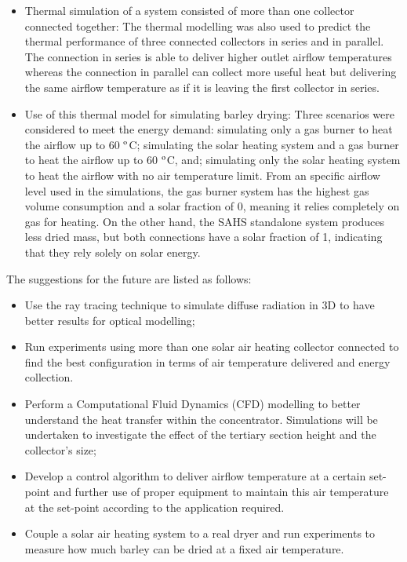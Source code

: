 \begin{itemize}
	\item Thermal simulation of a system consisted of more than one collector connected together: The thermal modelling was also used to predict the thermal performance of three connected collectors in series and in parallel. The connection in series is able to deliver higher outlet airflow temperatures whereas the connection in parallel can collect more useful heat but delivering the same airflow temperature as if it is leaving the first collector in series.
	
	
	\item Use of this thermal model for simulating barley drying: Three scenarios were considered to meet the energy demand: simulating only a gas burner to heat the airflow up to 60 $^{\rm{o}}$C; simulating the solar heating system and a gas burner to heat the airflow up to 60 $^{\rm{o}}$C, and; simulating only the solar heating system to heat the airflow with no air temperature limit. From an specific airflow level used in the simulations, the gas burner system has the highest gas volume consumption and a solar fraction of 0, meaning it relies completely on gas for heating. On the other hand, the SAHS standalone system produces less dried mass, but both connections have a solar fraction of 1, indicating that they rely solely on solar energy.
	
	
\end{itemize}

The suggestions for the future are listed as follows:

\begin{itemize}
	\item Use the ray tracing technique to simulate diffuse radiation in 3D to have better results for optical modelling;
    \item Run experiments using more than one solar air heating collector connected to find the best configuration in terms of air temperature delivered and energy collection.
    \item Perform a Computational Fluid Dynamics (CFD) modelling to better understand the heat transfer within the concentrator. Simulations will be undertaken to investigate the effect of the tertiary section height and the collector's size;
    \item Develop a control algorithm to deliver airflow temperature at a certain set-point and further use of proper equipment to maintain this air temperature at the set-point according to the application required.
    \item Couple a solar air heating system to a real dryer and run experiments to measure how much barley can be dried at a fixed air temperature.
\end{itemize}







